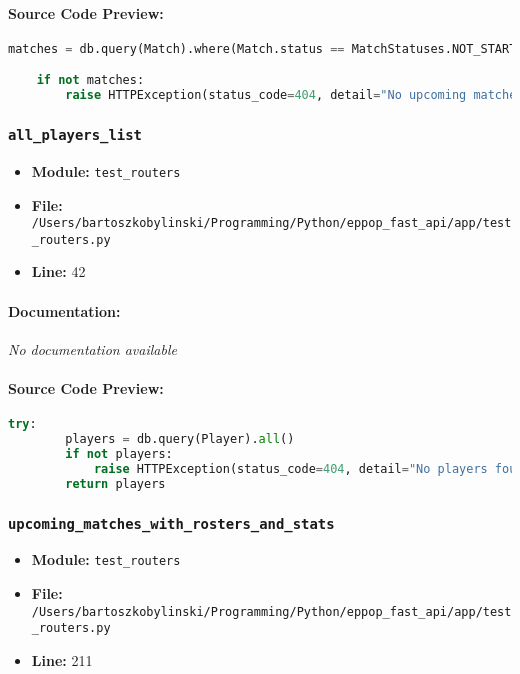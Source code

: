 \documentclass[11pt,a4paper]{article}
\begin{document}
\paragraph{Source Code Preview:}
\begin{lstlisting}[language=Python]
    matches = db.query(Match).where(Match.status == MatchStatuses.NOT_STARTED.value).join(Match.tournament).all()

    if not matches:
        raise HTTPException(status_code=404, detail="No upcoming matches found")

\end{lstlisting}

\vspace{1em}
\subsubsection{\texttt{all\_players\_list}}

\begin{itemize}
    \item \textbf{Module:} \texttt{test\_routers}
    \item \textbf{File:} \texttt{/Users/bartoszkobylinski/Programming/Python/eppop\_fast\_api/app/test\_routers.py}
    \item \textbf{Line:} 42
\end{itemize}

\paragraph{Documentation:} \textit{No documentation available}

\paragraph{Source Code Preview:}
\begin{lstlisting}[language=Python]
    try:
        players = db.query(Player).all()
        if not players:
            raise HTTPException(status_code=404, detail="No players found")
        return players
\end{lstlisting}

\vspace{1em}
\subsubsection{\texttt{upcoming\_matches\_with\_rosters\_and\_stats}}

\begin{itemize}
    \item \textbf{Module:} \texttt{test\_routers}
    \item \textbf{File:} \texttt{/Users/bartoszkobylinski/Programming/Python/eppop\_fast\_api/app/test\_routers.py}
    \item \textbf{Line:} 211
\end{itemize}
\end{document}
